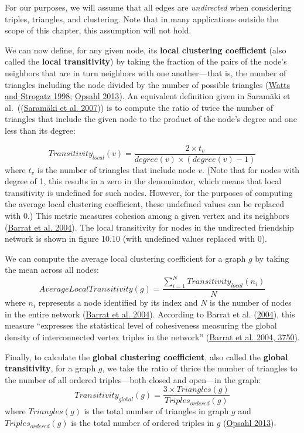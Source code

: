 \documentclass{book}
\begin{document}
For our purposes, we will assume that all edges are \emph{undirected} when
considering triples, triangles, and clustering. Note that in many applications
outside the scope of this chapter, this assumption will not hold.

We can now define, for any given node, its \textbf{local clustering
coefficient} (also called the \textbf{local transitivity}) by taking the
fraction of the pairs of the node's neighbors that are in turn neighbors with
one another---that is, the number of triangles including the node divided by
the number of possible triangles
(\protect\hyperlink{ref-WattsStrogatz1998}{Watts and Strogatz 1998};
\protect\hyperlink{ref-Opsahl2013}{Opsahl 2013}). An equivalent definition
given in Saramäki et al.~((\protect\hyperlink{ref-SaramakiEtAl2007}{Saramäki
et al. 2007})) is to compute the ratio of twice the number of triangles that
include the given node to the product of the node's degree and one less than
its degree:

\[Transitivity_{local}(v) = \frac{2 \times t_v}{degree(v) \times (degree(v) - 1)}\]
where \(t_v\) is the number of triangles that include node \(v\). (Note that
for nodes with degree of 1, this results in a zero in the denominator, which
means that local transitivity is undefined for such nodes. However, for the
purposes of computing the average local clustering coefficient, these
undefined values can be replaced with \(0\).) This metric measures cohesion
among a given vertex and its neighbors
(\protect\hyperlink{ref-BarratEtAl2004}{Barrat et al. 2004}). The local
transitivity for nodes in the undirected friendship network is shown in figure
10.10 (with undefined values replaced with \(0\)).

We can compute the average local clustering coefficient for a graph \(g\) by
taking the mean across all nodes:
\[AverageLocalTransitivity(g) = \frac{\sum_{i = 1}^{N}Transitivity_{local}(n_i)}{N}\]
where \(n_i\) represents a node identified by its index and \(N\) is the
number of nodes in the entire network
(\protect\hyperlink{ref-BarratEtAl2004}{Barrat et al. 2004}). According to
Barrat et al. (\protect\hyperlink{ref-BarratEtAl2004}{2004}), this measure
``expresses the statistical level of cohesiveness measuring the global density
of interconnected vertex triples in the network''
(\protect\hyperlink{ref-BarratEtAl2004}{Barrat et al. 2004, 3750}).

Finally, to calculate the \textbf{global clustering coefficient}, also called
the \textbf{global transitivity}, for a graph \(g\), we take the ratio of
thrice the number of triangles to the number of all ordered triples---both
closed and open---in the graph:
\[Transitivity_{global}(g) = \frac{3 \times Triangles(g)}{Triples_{ordered}(g)}\]
where \(Triangles(g)\) is the total number of triangles in graph \(g\) and
\(Triples_{ordered}(g)\) is the total number of ordered triples in \(g\)
(\protect\hyperlink{ref-Opsahl2013}{Opsahl 2013}).
\end{document}

